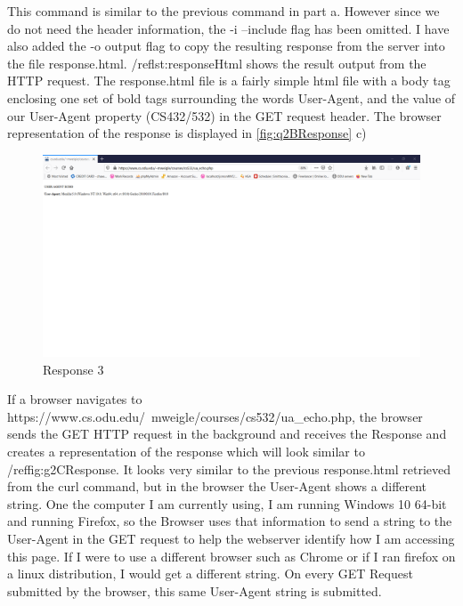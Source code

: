 \documentclass[12pt]{article}
\begin{document}
This command is similar to the previous command in part a. However since we do not need the header information, the -i --include flag has been omitted. I have also added the -o output flag to copy the resulting
response from the server into the file response.html. /ref{lst:responseHtml} shows the result output from the HTTP request. The response.html file is a fairly simple html file with a body tag enclosing one set of bold tags surrounding the words User-Agent, and  the value of our User-Agent property (CS432/532) in the GET request header. The browser representation of the response is displayed in \ref{fig:q2BResponse}
c)
\begin{figure}[h]
    \centering
    \includegraphics[trim=0 20 10 50, clip, width=\textwidth] {Q2/Q2c_Screenshot.png}
    \caption{Response 3}
    \label{fig:q2CResponse}
\end{figure}

If a browser navigates to https://www.cs.odu.edu/~mweigle/courses/cs532/ua\_echo.php, the browser sends the GET HTTP request in the background and receives the Response and creates a representation of
 the response which will look similar to /ref{fig:g2CResponse}. It looks very similar to the previous response.html retrieved from the curl command, but in the browser the User-Agent shows a different string. One
the computer I am currently using, I am running Windows 10 64-bit and running Firefox, so the Browser uses that information to send a string to the User-Agent in the GET request to help the webserver identify
how I am accessing this page. If I were to use a different browser such as Chrome or if I ran firefox on a linux distribution, I would get a different string. On every GET Request submitted by the browser, this same
User-Agent string is submitted.
\end{document}
